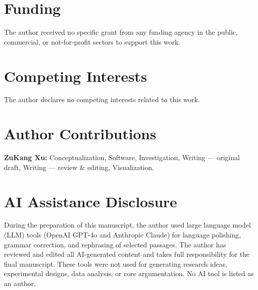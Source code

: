\section*{Funding}

The author received no specific grant from any funding agency in the public,
commercial, or not-for-profit sectors to support this work.

\section*{Competing Interests}

The author declares no competing interests related to this work.

\section*{Author Contributions}

\textbf{ZuKang Xu:} Conceptualization, Software, Investigation, Writing ---
original draft, Writing --- review \& editing, Visualization.

\section*{AI Assistance Disclosure}

During the preparation of this manuscript, the author used large language
model (LLM) tools (OpenAI GPT-4o and Anthropic Claude) for language
polishing, grammar correction, and rephrasing of selected passages. The
author has reviewed and edited all AI-generated content and takes full
responsibility for the final manuscript. These tools were not used for
generating research ideas, experimental designs, data analysis, or core
argumentation. No AI tool is listed as an author.
